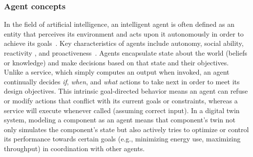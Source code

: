 \subsubsection{Agent concepts}
In the field of artificial intelligence, an intelligent agent is often defined as an entity that perceives its environment and acts upon it autonomously in order to achieve its goals~\cite{Wooldridge1995IntelligentAgents}. Key characteristics of agents include autonomy, social ability, reactivity , and proactiveness~\cite{Wooldridge1995IntelligentAgents, singh2005service}. Agents encapsulate state about the world (beliefs or knowledge) and make decisions based on that state and their objectives. Unlike a service, which simply computes an output when invoked, an agent continually decides \emph{if}, \emph{when}, and \emph{what} actions to take next in order to meet its design objectives. This intrinsic goal-directed behavior means an agent can refuse or modify actions that conflict with its current goals or constraints, whereas a service will execute whenever called (assuming correct input). In a digital twin system, modeling a component as an agent means that component’s twin not only simulates the component’s state but also actively tries to optimize or control its performance towards certain goals (e.g., minimizing energy use, maximizing throughput) in coordination with other agents.

